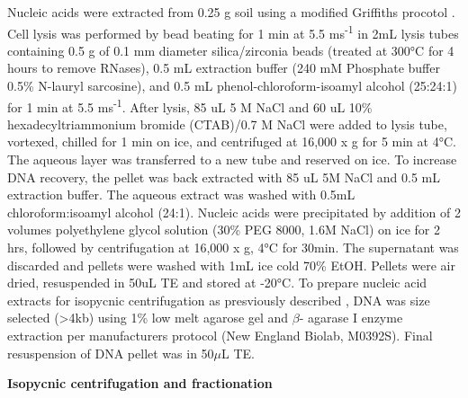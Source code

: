 Nucleic acids were extracted from 0.25 g soil using a modified Griffiths procotol \cite{Griffiths_2000}. Cell lysis was performed by bead beating for 1 min at 5.5 ms\textsuperscript{-1} in 2mL lysis tubes containing 0.5 g of 0.1 mm diameter silica/zirconia beads (treated at 300°C for 4 hours to remove RNases), 0.5 mL extraction buffer (240 mM Phosphate buffer
0.5\% N-lauryl sarcosine), and 0.5 mL phenol-chloroform-isoamyl alcohol (25:24:1) for 1 min at 5.5 ms\textsuperscript{-1}. After lysis, 85 uL 5 M NaCl and 60 uL 10\% hexadecyltriammonium bromide (CTAB)/0.7 M NaCl were added to lysis tube, vortexed, chilled for 1 min on ice, and centrifuged at 16,000 x g for 5 min at 4°C. The aqueous layer was transferred to a new tube and reserved on ice. To increase DNA recovery, the pellet was back extracted with 85 uL 5M NaCl and 0.5 mL extraction buffer. The aqueous extract was washed with 0.5mL chloroform:isoamyl alcohol (24:1). Nucleic acids were precipitated by addition of 2 volumes polyethylene glycol solution (30\% PEG 8000, 1.6M NaCl) on ice for 2 hrs, followed by centrifugation at 16,000 x g, 4°C for 30min. The supernatant was discarded and pellets were washed with 1mL ice cold 70\% EtOH. Pellets were air dried, resuspended in 50uL TE and stored at -20°C. To prepare nucleic acid extracts for isopycnic centrifugation as presviously described \cite{Buckley_2007}, DNA was size selected (\textgreater4kb) using 1\% low melt agarose gel and $\beta$- agarase I enzyme extraction per manufacturers protocol (New England Biolab, M0392S).  Final resuspension of DNA pellet was in 50$\mu$L TE.   


\textbf{Isopycnic centrifugation and fractionation}

